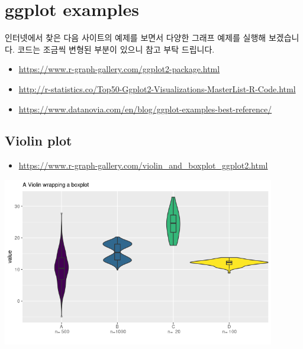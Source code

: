 \documentclass[
]{book}
\providecommand{\tightlist}{%
  \setlength{\itemsep}{0pt}\setlength{\parskip}{0pt}}
\begin{document}
\hypertarget{ggplot-examples}{%
\section{ggplot examples}\label{ggplot-examples}}

인터넷에서 찾은 다음 사이트의 예제를 보면서 다양한 그래프 예제를 실행해 보겠습니다. 코드는 조금씩 변형된 부분이 있으니 참고 부탁 드립니다.

\begin{itemize}
\tightlist
\item
  \url{https://www.r-graph-gallery.com/ggplot2-package.html}
\item
  \url{http://r-statistics.co/Top50-Ggplot2-Visualizations-MasterList-R-Code.html}
\item
  \url{https://www.datanovia.com/en/blog/ggplot-examples-best-reference/}
\end{itemize}

\hypertarget{violin-plot}{%
\subsection{Violin plot}\label{violin-plot}}

\begin{itemize}
\tightlist
\item
  \url{https://www.r-graph-gallery.com/violin_and_boxplot_ggplot2.html}
\end{itemize}

\includegraphics[width=4.6875in,height=\textheight]{images/10/000013.png}
\end{document}
